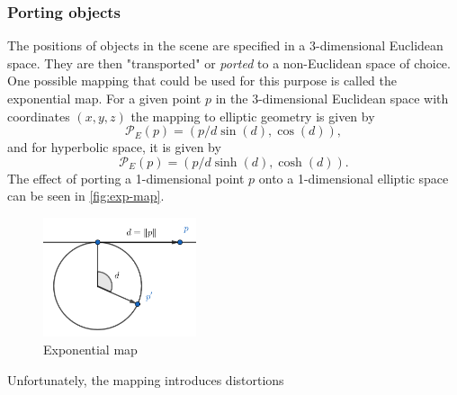 \subsubsection*{Porting objects}
The positions of objects in the scene are specified in a 3-dimensional Euclidean space.
They are then "transported" or \textit{ported} to a non-Euclidean space of choice.
One possible mapping that could be used for this purpose is called the exponential map.
For a given point $p$ in the 3-dimensional Euclidean space with coordinates $(x, y, z)$ the mapping to elliptic geometry is given by
\begin{equation*}
    \mathcal{P}_E(p) = (p / d \sin(d), \cos(d)),
\end{equation*}
and for hyperbolic space, it is given by
\begin{equation*}
    \mathcal{P}_E(p) = (p / d \sinh(d), \cosh(d)).
\end{equation*}
The effect of porting a 1-dimensional point $p$ onto a 1-dimensional elliptic space can be seen in \autoref{fig:exp-map}.
\begin{figure}[h]
    \centering
    \includegraphics[width=0.4\textwidth]{chapters/theoretical_foundations/sections/non-eudlidean-spaces/resources/exp-map.png}
    \caption{Exponential map}
    \label{fig:exp-map}
\end{figure}

Unfortunately, the mapping introduces distortions